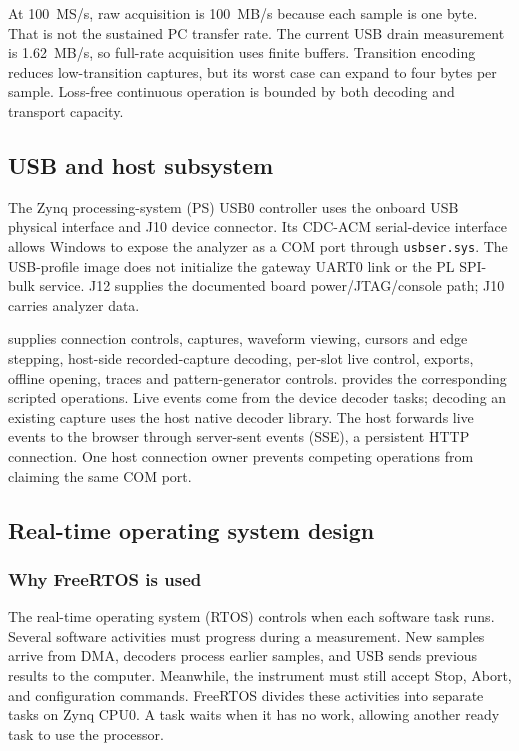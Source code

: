 \documentclass[11pt,a4paper]{article}
\newcommand{\code}[1]{\texttt{\detokenize{#1}}}
\begin{document}
At 100~MS/s, raw acquisition is 100~MB/s because each sample is one byte. That is
not the sustained PC transfer rate. The current USB drain measurement is
1.62~MB/s, so full-rate acquisition uses finite buffers. Transition encoding
reduces low-transition captures, but its worst case can expand to four bytes per
sample. Loss-free continuous operation is bounded by both decoding and transport
capacity.

\subsection{USB and host subsystem}

The Zynq processing-system (PS) USB0 controller uses the onboard USB physical
interface and J10 device connector. Its CDC-ACM serial-device interface allows
Windows to expose the analyzer as a COM port through
\texttt{usbser.sys}. The USB-profile image does not initialize the gateway UART0
link or the PL SPI-bulk service. J12 supplies the documented board
power/JTAG/console path; J10 carries analyzer data.

\code{la-ui} supplies connection controls, captures, waveform viewing, cursors
and edge stepping, host-side recorded-capture decoding, per-slot live control,
exports, offline opening, traces and pattern-generator controls. \code{la-cli}
provides the corresponding scripted operations. Live events come from the
device decoder tasks; decoding an existing capture uses the host native decoder
library. The host forwards live events to the browser through server-sent events
(SSE), a persistent HTTP connection. One host connection owner
prevents competing operations from claiming the same COM port.

\subsection{Real-time operating system design}
\label{sec:rtos}

\subsubsection{Why FreeRTOS is used}

The real-time operating system (RTOS) controls when each software task runs.
Several software activities must progress during a measurement. New samples
arrive from DMA, decoders process earlier samples, and USB sends previous results
to the computer. Meanwhile, the instrument must still accept Stop, Abort, and
configuration commands. FreeRTOS divides these activities into separate tasks
on Zynq CPU0. A task waits when it has no work, allowing another ready task to
use the processor.
\end{document}
